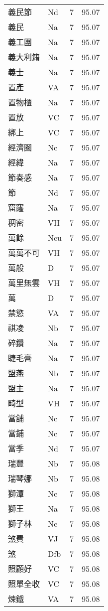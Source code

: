\documentclass[twocolumn]{book}
\begin{document}
\begin{supertabular}{llrr}
義民節 & Nd & 7 &  95.07\\
義民 & Na & 7 &  95.07\\
義工團 & Na & 7 &  95.07\\
義大利籍 & Na & 7 &  95.07\\
義士 & Na & 7 &  95.07\\
置產 & VA & 7 &  95.07\\
置物櫃 & Na & 7 &  95.07\\
置放 & VC & 7 &  95.07\\
綁上 & VC & 7 &  95.07\\
經濟圈 & Nc & 7 &  95.07\\
經緯 & Na & 7 &  95.07\\
節奏感 & Na & 7 &  95.07\\
節 & Nd & 7 &  95.07\\
窟窿 & Na & 7 &  95.07\\
稠密 & VH & 7 &  95.07\\
萬餘 & Neu & 7 &  95.07\\
萬萬不可 & VH & 7 &  95.07\\
萬般 & D & 7 &  95.07\\
萬里無雲 & VH & 7 &  95.07\\
萬 & D & 7 &  95.07\\
禁慾 & VA & 7 &  95.07\\
祺凌 & Nb & 7 &  95.07\\
碎鑽 & Na & 7 &  95.07\\
睫毛膏 & Na & 7 &  95.07\\
盟燕 & Nb & 7 &  95.07\\
盟主 & Na & 7 &  95.07\\
畸型 & VH & 7 &  95.07\\
當舖 & Nc & 7 &  95.07\\
當鋪 & Nc & 7 &  95.07\\
當季 & Nd & 7 &  95.07\\
瑞豐 & Nb & 7 &  95.08\\
瑞琴娜 & Nb & 7 &  95.08\\
獅潭 & Nc & 7 &  95.08\\
獅王 & Na & 7 &  95.08\\
獅子林 & Nc & 7 &  95.08\\
煞費 & VJ & 7 &  95.08\\
煞 & Dfb & 7 &  95.08\\
照顧好 & VC & 7 &  95.08\\
照單全收 & VC & 7 &  95.08\\
煉鐵 & VA & 7 &  95.08\\

\end{supertabular}
\end{document}
